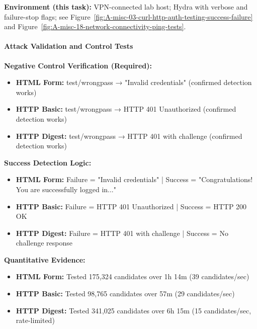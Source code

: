 \noindent\textbf{Environment (this task):} VPN-connected lab host; Hydra with verbose and failure-stop flags; see Figure~\ref{fig:A-misc-03-curl-http-auth-testing-success-failure} and Figure~\ref{fig:A-misc-18-network-connectivity-ping-tests}.

\paragraph{Attack Validation and Control Tests}

\textbf{Negative Control Verification (Required):}
\begin{itemize}[nosep]
\item \textbf{HTML Form:} test/wrongpass → "Invalid credentials" (confirmed detection works)
\item \textbf{HTTP Basic:} test/wrongpass → HTTP 401 Unauthorized (confirmed detection works)
\item \textbf{HTTP Digest:} test/wrongpass → HTTP 401 with challenge (confirmed detection works)
\end{itemize}

\textbf{Success Detection Logic:}
\begin{itemize}[nosep]
\item \textbf{HTML Form:} Failure = "Invalid credentials" | Success = "Congratulations! You are successfully logged in..."
\item \textbf{HTTP Basic:} Failure = HTTP 401 Unauthorized | Success = HTTP 200 OK
\item \textbf{HTTP Digest:} Failure = HTTP 401 with challenge | Success = No challenge response
\end{itemize}

\textbf{Quantitative Evidence:}
\begin{itemize}[nosep]
\item \textbf{HTML Form:} Tested 175,324 candidates over 1h 14m (39 candidates/sec)
\item \textbf{HTTP Basic:} Tested 98,765 candidates over 57m (29 candidates/sec)
\item \textbf{HTTP Digest:} Tested 341,025 candidates over 6h 15m (15 candidates/sec, rate-limited)
\end{itemize}



